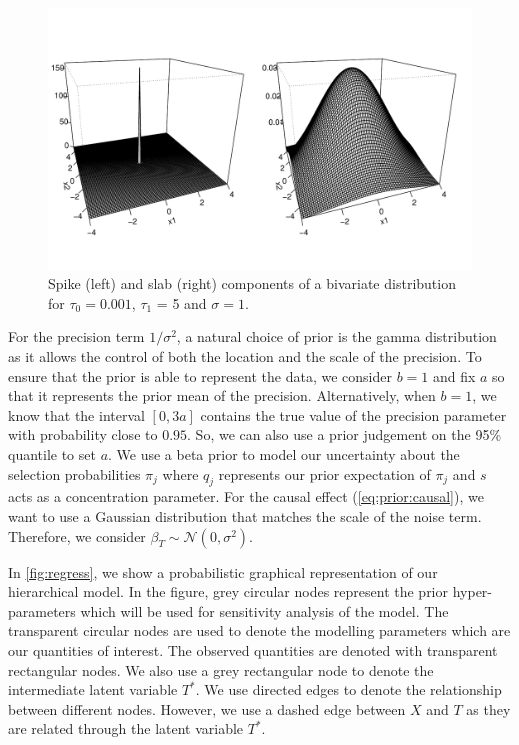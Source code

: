 \documentclass[preprint,12pt]{elsarticle}
\newcommand{\normal}{\mathcal{N}}
\begin{document}
\begin{figure}[h]
	\begin{center}
		\includegraphics[width = 0.95\linewidth]{spike_slab_bi.pdf}
	\end{center}
	\caption{Spike (left) and slab (right) components of a bivariate distribution for $\tau_0 = 0.001$, $\tau_1$ = 5 and $\sigma=1$.}
	\label{fig:ssbl}
\end{figure}

For the precision term $1/\sigma^2$, a natural choice of prior is the gamma distribution
as it allows the control of both the location and the scale of the precision.
To ensure that the prior is able to represent the data, we consider $b=1$ and 
fix $a$ so that it represents the prior mean of the precision.
Alternatively, when $b=1$, we know that the interval
$[0, 3a]$ contains the true value of the precision parameter with probability close to $0.95$.
So, we can also use a prior judgement on the 95\% quantile to set $a$.
We use a beta prior to
model our uncertainty about
the selection probabilities $\pi_j$ where  $q_j$ represents our prior expectation of $\pi_j$ and $s$ acts as 
a concentration parameter.
For the causal effect (\cref{eq:prior:causal}), we want to use a Gaussian distribution that 
matches the scale of the noise term. Therefore, we consider $\beta_T\sim \normal(0,\sigma^2)$. 

In \cref{fig:regress}, we show a probabilistic graphical representation
of our hierarchical model. In the figure, grey circular nodes represent the
prior hyper-parameters which will be used for sensitivity analysis
of the model. The transparent circular nodes are used to denote
the modelling parameters which are our quantities of interest. 
The observed quantities are denoted with transparent rectangular
nodes. We also use a grey rectangular node to denote the intermediate
latent variable $T^*$. We use directed edges to denote the
relationship between different nodes. However, we use a dashed
edge between $X$ and $T$ as they are related through the latent
variable $T^*$. 
\end{document}
